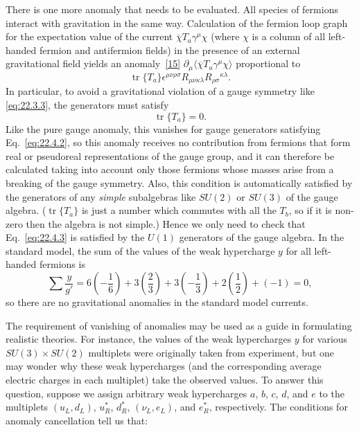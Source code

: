 There is one more anomaly that needs to be evaluated. All species of
fermions interact with gravitation in the same way. Calculation of the
fermion loop graph for the expectation value of the current
$\overline\chi T_a\gamma^\mu\chi$ (where $\chi$ is a column of all
left-handed fermion and antifermion fields) in the presence of an external
gravitational field yields an anomaly~\hyperref[ch22-ref-15]{[15]}
$\partial_\mu\langle\overline\chi T_a\gamma^\mu\chi\rangle$
proportional to
\[
 \operatorname{tr}\{T_a\}\epsilon^{\mu\nu\rho\sigma}
 R_{\mu\nu\kappa\lambda}R_{\rho\sigma}{}^{\kappa\lambda}.
\]
In particular, to avoid a gravitational violation of a gauge symmetry like
\eqref{eq:22.3.3}, the generators must satisfy
\begin{equation}
 \operatorname{tr}\{T_a\}=0.
 \tag{22.4.3}\label{eq:22.4.3}
\end{equation}
Like the pure gauge anomaly, this vanishes for gauge generators satisfying
Eq.~\eqref{eq:22.4.2}, so this anomaly receives no contribution from
fermions that form real or pseudoreal representations of the gauge group,
and it can therefore be calculated taking into account only those fermions
whose masses arise from a breaking of the gauge symmetry. Also, this
condition is automatically satisfied by the generators of any
\emph{simple} subalgebras like $SU(2)$ or $SU(3)$ of the gauge algebra.
($\operatorname{tr}\{T_a\}$ is just a number which commutes with all
the $T_b$, so if it is non-zero then the algebra is not simple.) Hence
we only need to check that Eq.~\eqref{eq:22.4.3} is satisfied by the $U(1)$
generators of the gauge algebra. In the standard model, the sum of the
values of the weak hypercharge $y$ for all left-handed fermions is
\[
 \sum\frac{y}{g'}
 =6\left(-\frac{1}{6}\right)
 +3\left(\frac{2}{3}\right)
 +3\left(-\frac{1}{3}\right)
 +2\left(\frac{1}{2}\right)+(-1)=0,
\]
so there are no gravitational anomalies in the standard model currents.

The requirement of vanishing of anomalies may be used as a guide in
formulating realistic theories. For instance, the values of the weak
hypercharges $y$ for various $SU(3)\times SU(2)$ multiplets were originally
taken from experiment, but one may wonder why these weak hypercharges (and
the corresponding average electric charges in each multiplet) take the
observed values. To answer this question, suppose we assign arbitrary weak
hypercharges $a$, $b$, $c$, $d$, and $e$ to the multiplets
$(u_L,d_L)$, $u_R^*$, $d_R^*$, $(\nu_L,e_L)$, and $e_R^*$,
respectively. The conditions for anomaly cancellation tell us that:

